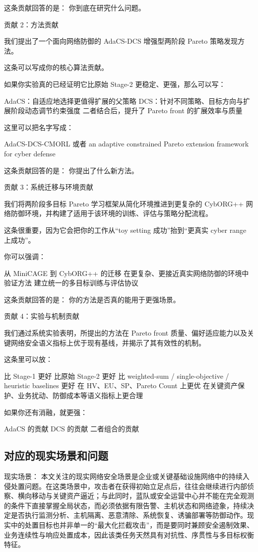 \documentclass[12pt,a4paper]{article}
\begin{document}
这条贡献回答的是：
你到底在研究什么问题。

贡献 2：方法贡献

我们提出了一个面向网络防御的 AdaCS-DCS 增强型两阶段 Pareto 策略发现方法。

这条可以写成你的核心算法贡献。

如果你实验真的已经证明它比原始 Stage-2 更稳定、更强，那么可以写：

AdaCS：自适应地选择更值得扩展的父策略
DCS：针对不同策略、目标方向与扩展阶段动态调节约束强度
二者结合后，提升了 Pareto front 的扩展效率与质量

这里可以把名字写成：

AdaCS-DCS-CMORL
或者
an adaptive constrained Pareto extension framework for cyber defense

这条贡献回答的是：
你提出了什么新方法。

贡献 3：系统迁移与环境贡献

我们将两阶段多目标 Pareto 学习框架从简化环境推进到更复杂的 CybORG++ 网络防御环境，并构建了适用于该环境的训练、评估与策略分配流程。

这条很重要，因为它会把你的工作从“toy setting 成功”抬到“更真实 cyber range 上成功”。

你可以强调：

从 MiniCAGE 到 CybORG++ 的迁移
在更复杂、更接近真实网络防御的环境中验证方法
建立统一的多目标训练与评估协议

这条贡献回答的是：
你的方法是否真的能用于更强场景。

贡献 4：实验与机制贡献

我们通过系统实验表明，所提出的方法在 Pareto front 质量、偏好适应能力以及关键网络安全语义指标上优于现有基线，并揭示了其有效性的机制。

这条里可以放：

比 Stage-1 更好
比原始 Stage-2 更好
比 weighted-sum / single-objective / heuristic baselines 更好
在 HV、EU、SP、Pareto Count 上更优
在关键资产保护、业务扰动、防御成本等语义指标上更合理

如果你还有消融，就更强：

AdaCS 的贡献
DCS 的贡献
二者组合的贡献


\subsection{对应的现实场景和问题}
现实场景：
本文关注的现实网络安全场景是企业或关键基础设施网络中的持续入侵处置问题。在这类场景中，攻击者在获得初始立足点后，往往会继续进行内部侦察、横向移动与关键资产逼近；与此同时，蓝队或安全运营中心并不能在完全观测的条件下直接掌握全局状态，而必须依据有限告警、主机状态和网络迹象，持续决定是否执行监测分析、主机隔离、恶意清除、系统恢复、诱骗部署等防御动作。现实中的处置目标也并非单一的“最大化拦截攻击”，而是要同时兼顾安全遏制效果、业务连续性与响应处置成本，因此该类任务天然具有对抗性、序贯性与多目标权衡特征。
\end{document}
